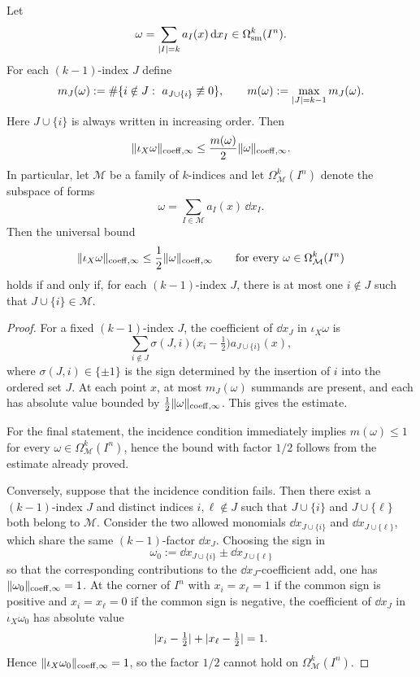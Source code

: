 \begin{proposition}
\label{prop:incidence-criterion}
Let
\[
\omega=\sum_{\lvert I \rvert=k} a_I(x)\,\mathrm{d} x_I
\in\Omega^k_{\mathrm{sm}}(I^n).
\]
For each $(k-1)$-index $J$ define
\[
m_J(\omega):=
\#\{i\notin J:\ a_{J\cup\{i\}}\not\equiv 0\},
\qquad
m(\omega):=\max_{\lvert J \rvert=k-1}m_J(\omega).
\]
Here $J\cup\{i\}$ is always written in increasing order.
Then
\[
\lVert \iota_X\omega \rVert_{\mathrm{coeff},\infty}
\le
\frac{m(\omega)}{2}\lVert \omega \rVert_{\mathrm{coeff},\infty}.
\]
In particular, let $\mathcal M$ be a family of $k$-indices and let
$\Omega^k_{\mathcal M}(I^n)$ denote the subspace of forms
\[
\omega=\sum_{I\in\mathcal M} a_I(x)\,\dd x_I.
\]
Then the universal bound
\[
\lVert \iota_X\omega \rVert_{\mathrm{coeff},\infty}\le \frac12\lVert \omega \rVert_{\mathrm{coeff},\infty}
\qquad
\text{for every }\omega\in\Omega^k_{\mathcal M}(I^n)
\]
holds if and only if, for each $(k-1)$-index $J$, there is at most one
$i\notin J$ such that $J\cup\{i\}\in\mathcal M$.
\end{proposition}

\begin{proof}
For a fixed $(k-1)$-index $J$, the coefficient of $\dd x_J$ in $\iota_X\omega$
is
\[
\sum_{i\notin J}\sigma(J,i)\bigl(x_i-\tfrac12\bigr)a_{J\cup\{i\}}(x),
\]
where $\sigma(J,i)\in\{\pm1\}$ is the sign determined by the insertion of $i$
into the ordered set $J$. At each point $x$, at most $m_J(\omega)$ summands are
present, and each has absolute value bounded by
$\frac12\lVert \omega \rVert_{\mathrm{coeff},\infty}$. This gives the estimate.

For the final statement, the incidence condition immediately implies
$m(\omega)\le 1$ for every $\omega\in\Omega^k_{\mathcal M}(I^n)$, hence the
bound with factor $1/2$ follows from the estimate already proved.

Conversely, suppose that the incidence condition fails. Then there exist a
$(k-1)$-index $J$ and distinct indices $i,\ell\notin J$ such that
$J\cup\{i\}$ and $J\cup\{\ell\}$ both belong to $\mathcal M$. Consider the two
allowed monomials $\dd x_{J\cup\{i\}}$ and $\dd x_{J\cup\{\ell\}}$, which
share the same $(k-1)$-factor $\dd x_J$. Choosing the sign in
\[
\omega_0:=\dd x_{J\cup\{i\}}\pm \dd x_{J\cup\{\ell\}}
\]
so that the corresponding contributions to the $\dd x_J$-coefficient add, one
has $\lVert \omega_0 \rVert_{\mathrm{coeff},\infty}=1$. At the corner of $I^n$ with
$x_i=x_\ell=1$ if the common sign is positive and $x_i=x_\ell=0$ if the common
sign is negative, the coefficient of $\dd x_J$ in $\iota_X\omega_0$ has
absolute value
\[
\lvert x_i-\tfrac12 \rvert+\lvert x_\ell-\tfrac12 \rvert=1.
\]
Hence $\lVert \iota_X\omega_0 \rVert_{\mathrm{coeff},\infty}=1$, so the factor $1/2$ cannot
hold on $\Omega^k_{\mathcal M}(I^n)$.
\end{proof}

